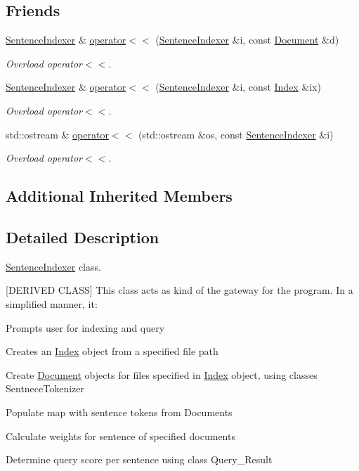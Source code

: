 \subsection*{Friends}
\begin{DoxyCompactItemize}
\item 
\hyperlink{class_sentence_indexer}{Sentence\+Indexer} \& \hyperlink{class_sentence_indexer_a30be5b0aa936deff7dc8763b554083ef}{operator$<$$<$} (\hyperlink{class_sentence_indexer}{Sentence\+Indexer} \&i, const \hyperlink{class_document}{Document} \&d)
\begin{DoxyCompactList}\small\item\em Overload operator$<$$<$. \end{DoxyCompactList}\item 
\hyperlink{class_sentence_indexer}{Sentence\+Indexer} \& \hyperlink{class_sentence_indexer_ae40f2c0786940505a8881ad209f2e892}{operator$<$$<$} (\hyperlink{class_sentence_indexer}{Sentence\+Indexer} \&i, const \hyperlink{class_index}{Index} \&ix)
\begin{DoxyCompactList}\small\item\em Overload operator$<$$<$. \end{DoxyCompactList}\item 
std\+::ostream \& \hyperlink{class_sentence_indexer_a8508e3ba7ddd0063c317c20295354e03}{operator$<$$<$} (std\+::ostream \&os, const \hyperlink{class_sentence_indexer}{Sentence\+Indexer} \&i)
\begin{DoxyCompactList}\small\item\em Overload operator$<$$<$. \end{DoxyCompactList}\end{DoxyCompactItemize}
\subsection*{Additional Inherited Members}


\subsection{Detailed Description}
\hyperlink{class_sentence_indexer}{Sentence\+Indexer} class. 

\mbox{[}D\+E\+R\+I\+V\+ED C\+L\+A\+SS\mbox{]} This class acts as kind of the gateway for the program. In a simplified manner, it\+:
\begin{DoxyItemize}
\item Prompts user for indexing and query
\item Creates an \hyperlink{class_index}{Index} object from a specified file path
\item Create \hyperlink{class_document}{Document} objects for files specified in \hyperlink{class_index}{Index} object, using classes Sentnece\+Tokenizer
\item Populate map with sentence tokens from Documents
\item Calculate weights for sentence of specified documents
\item Determine query score per sentence using class Query\+\_\+\+Result 
\end{DoxyItemize}

